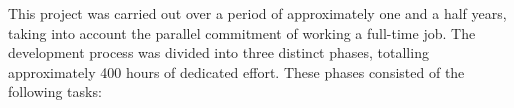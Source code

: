 
This project was carried out over a period of approximately one and a half years, taking into account the parallel commitment of working a full-time job. The development process was divided into three distinct phases, totalling approximately 400 hours of dedicated effort. These phases consisted of the following tasks:

